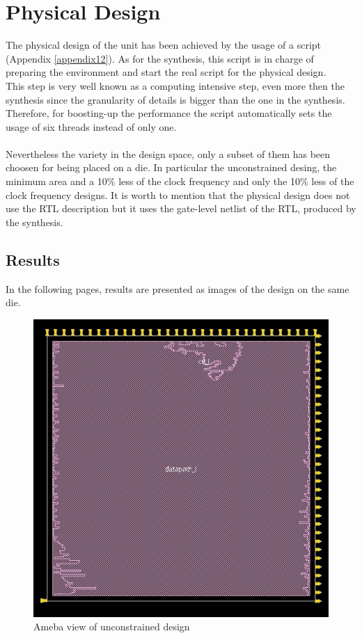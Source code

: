 \chapter{Physical Design}
\label{pd}
The physical design of the unit has been achieved by the usage of a script (Appendix \ref{appendix12}). As for the synthesis, this script is in charge of preparing the environment and start the real script for the physical design.\\ This step is very well known as a computing intensive step, even more then the synthesis since the granularity of details is bigger than the one in the synthesis. Therefore, for boosting-up the performance the script automatically sets the usage of six threads instead of only one.\\\\
Nevertheless the variety in the design space, only a subset of them has been choosen for being placed on a die. In particular the unconstrained desing, the minimum area and a 10\% less of the clock frequency and only the 10\% less of the clock frequency designs. It is worth to mention that the physical design does not use the RTL description but it uses the gate-level netlist of the RTL, produced by the synthesis.\\
\section{Results}
In the following pages, results are presented as images of the design on the same die.

\begin{figure}[!htbp]
\centering
\captionsetup{justification=centering}
\includegraphics[scale=0.6,angle=0]{../project/physical_design/images_nopt/DLX_IR_SIZE32_PC_SIZE32_nopt_ameba_prerouting.jpg}
\caption{Ameba view of unconstrained design}
\label{fig:amebano}
\end{figure}



